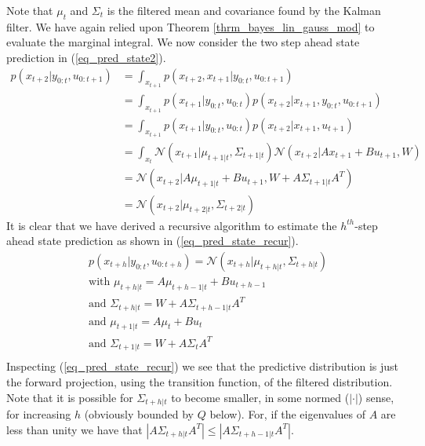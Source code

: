 Note that $\mu_t$ and $\Sigma_t$ is the filtered mean and covariance found by the Kalman filter. We have again relied upon Theorem \ref{thrm_bayes_lin_gauss_mod} to evaluate the marginal integral. We now consider the two step ahead state prediction in (\ref{eq_pred_state2}).
\begin{equation}
\begin{aligned}
p(x_{t+2}|y_{0:t}, u_{0:t+1}) &= \int_{x_{t+1}} p(x_{t+2},x_{t+1}|y_{0:t}, u_{0:t+1}) \\
&= \int_{x_{t+1}} p(x_{t+1}|y_{0:t}, u_{0:t}) p(x_{t+2}|x_{t+1},y_{0:t}, u_{0:t+1}) \\
&= \int_{x_{t+1}} p(x_{t+1}|y_{0:t}, u_{0:t}) p(x_{t+2}|x_{t+1}, u_{t+1}) \\
&= \int_{x_t} \mathcal{N}(x_{t+1}|\mu_{t+1|t}, \Sigma_{t+1|t})\mathcal{N}(x_{t+2}|Ax_{t+1}+Bu_{t+1}, W) \\
&= \mathcal{N}(x_{t+2}|A\mu_{t+1|t}+Bu_{t+1}, W+A\Sigma_{t+1|t} A^T) \\
&= \mathcal{N}(x_{t+2}|\mu_{t+2|t}, \Sigma_{t+2|t})
\end{aligned}
\label{eq_pred_state2}
\end{equation}
It is clear that we have derived a recursive algorithm to estimate the $h^{th}$-step ahead state prediction as shown in (\ref{eq_pred_state_recur}).
\begin{equation}
\begin{aligned}
&p(x_{t+h}|y_{0:t}, u_{0:t+h}) = \mathcal{N}(x_{t+h}|\mu_{t+h|t}, \Sigma_{t+h|t}) \\
&\text{with } \mu_{t+h|t} = A\mu_{t+h-1|t}+Bu_{t+h-1} \\
&\text{and } \Sigma_{t+h|t} = W+A\Sigma_{t+h-1|t} A^T \\
&\text{and } \mu_{t+1|t} = A\mu_t+Bu_{t} \\
&\text{and } \Sigma_{t+1|t} = W+A\Sigma_t A^T \\ 
\end{aligned}
\label{eq_pred_state_recur}
\end{equation}
Inspecting (\ref{eq_pred_state_recur}) we see that the predictive distribution is just the forward projection, using the transition function, of the filtered distribution. Note that it is possible for $\Sigma_{t+h|t}$ to become smaller, in some normed ($|\cdot|$) sense, for increasing $h$ (obviously bounded by $Q$ below). For, if the eigenvalues of $A$ are less than unity we have that $|A\Sigma_{t+h|t}A^T| \leq |A\Sigma_{t+h-1|t}A^T|$.

